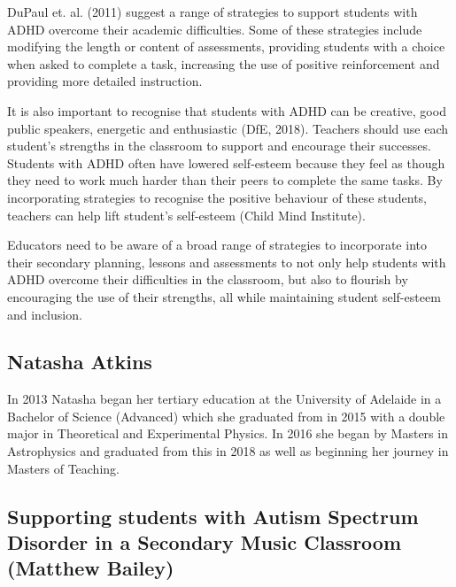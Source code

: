 \documentclass[twoside,14pt,a4paper,notitlepage]{memoir}
\begin{document}
DuPaul et. al. (2011) suggest a range of strategies to support students with ADHD overcome their academic difficulties. Some of these strategies include modifying the length or content of assessments, providing students with a choice when asked to complete a task, increasing the use of positive reinforcement and providing more detailed instruction.

It is also important to recognise that students with ADHD can be creative, good public speakers, energetic and enthusiastic (DfE, 2018). Teachers should use each student’s strengths in the classroom to support and encourage their successes. Students with ADHD often have lowered self-esteem because they feel as though they need to work much harder than their peers to complete the same tasks. By incorporating strategies to recognise the positive behaviour of these students, teachers can help lift student’s self-esteem (Child Mind Institute).

Educators need to be aware of a broad range of strategies to incorporate into their secondary planning, lessons and assessments to not only help students with ADHD overcome their difficulties in the classroom, but also to flourish by encouraging the use of their strengths, all while maintaining student self-esteem and inclusion.

\subsection*{Natasha Atkins}

In 2013 Natasha began her tertiary education at the University of Adelaide in a Bachelor of Science (Advanced) which she graduated from in 2015 with a double major in Theoretical and Experimental Physics. In 2016 she began by Masters in Astrophysics and graduated from this in 2018 as well as beginning her journey in Masters of Teaching. 



\subsection*{Supporting students with Autism Spectrum Disorder in a Secondary Music Classroom (Matthew Bailey)}
\end{document}
